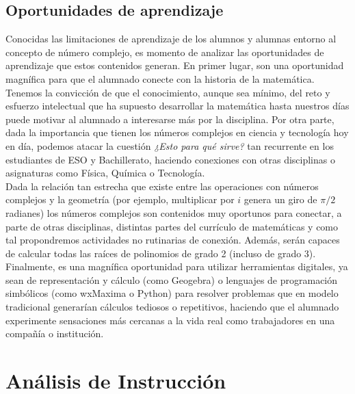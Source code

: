 \documentclass[../main.tex]{memoir}
\begin{document}
\subsection{Oportunidades de aprendizaje}

Conocidas las limitaciones de aprendizaje de los alumnos y alumnas entorno al concepto de número complejo, es momento de analizar las oportunidades de aprendizaje que estos contenidos generan. En primer lugar, son una oportunidad magnífica para que el alumnado conecte con la historia de la matemática. Tenemos la convicción de que el conocimiento, aunque sea mínimo, del reto y esfuerzo intelectual que ha supuesto desarrollar la matemática hasta nuestros días puede motivar al alumnado a interesarse más por la disciplina. Por otra parte, dada la importancia que tienen los números complejos en ciencia y tecnología hoy en día, podemos atacar la cuestión \textit{¿Esto para qué sirve?} tan recurrente en los estudiantes de ESO y Bachillerato, haciendo conexiones con otras disciplinas o asignaturas como Física, Química o Tecnología. \\

Dada la relación tan estrecha que existe entre las operaciones con números complejos y la geometría (por ejemplo, multiplicar por $i$ genera un giro de $\pi/2$ radianes) los números complejos son contenidos muy oportunos para conectar, a parte de otras disciplinas, distintas partes del currículo de matemáticas y como tal propondremos actividades no rutinarias de conexión. Además, serán capaces de calcular todas las raíces de polinomios de grado 2 (incluso de grado 3).\\

Finalmente, es una magnífica oportunidad para utilizar herramientas digitales, ya sean de representación y cálculo (como Geogebra) o lenguajes de programación simbólicos (como wxMaxima o Python) para resolver problemas que en modelo tradicional generarían cálculos tediosos o repetitivos, haciendo que el alumnado experimente sensaciones más cercanas a la vida real como trabajadores en una compañía o institución. 

\section{Análisis de Instrucción}
\end{document}
